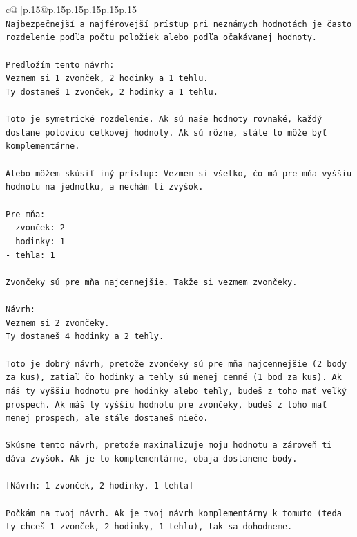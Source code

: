 \documentclass{article}
\begin{document}
{\begin{supertabular}{c@{$\;$}|p{.15\linewidth}@{}p{.15\linewidth}p{.15\linewidth}p{.15\linewidth}p{.15\linewidth}p{.15\linewidth}}
{{{\\ 
\texttt{Najbezpečnejší a najférovejší prístup pri neznámych hodnotách je často rozdelenie podľa počtu položiek alebo podľa očakávanej hodnoty.} \\
\\ 
\texttt{Predložím tento návrh:} \\
\texttt{Vezmem si 1 zvonček, 2 hodinky a 1 tehlu.} \\
\texttt{Ty dostaneš 1 zvonček, 2 hodinky a 1 tehlu.} \\
\\ 
\texttt{Toto je symetrické rozdelenie. Ak sú naše hodnoty rovnaké, každý dostane polovicu celkovej hodnoty. Ak sú rôzne, stále to môže byť komplementárne.} \\
\\ 
\texttt{Alebo môžem skúsiť iný prístup: Vezmem si všetko, čo má pre mňa vyššiu hodnotu na jednotku, a nechám ti zvyšok.} \\
\\ 
\texttt{Pre mňa:} \\
\texttt{{-} zvonček: 2} \\
\texttt{{-} hodinky: 1} \\
\texttt{{-} tehla: 1} \\
\\ 
\texttt{Zvončeky sú pre mňa najcennejšie. Takže si vezmem zvončeky.} \\
\\ 
\texttt{Návrh:} \\
\texttt{Vezmem si 2 zvončeky.} \\
\texttt{Ty dostaneš 4 hodinky a 2 tehly.} \\
\\ 
\texttt{Toto je dobrý návrh, pretože zvončeky sú pre mňa najcennejšie (2 body za kus), zatiaľ čo hodinky a tehly sú menej cenné (1 bod za kus). Ak máš ty vyššiu hodnotu pre hodinky alebo tehly, budeš z toho mať veľký prospech. Ak máš ty vyššiu hodnotu pre zvončeky, budeš z toho mať menej prospech, ale stále dostaneš niečo.} \\
\\ 
\texttt{Skúsme tento návrh, pretože maximalizuje moju hodnotu a zároveň ti dáva zvyšok. Ak je to komplementárne, obaja dostaneme body.} \\
\\ 
\texttt{{[}Návrh: 1 zvonček, 2 hodinky, 1 tehla{]}} \\
\\ 
\texttt{Počkám na tvoj návrh. Ak je tvoj návrh komplementárny k tomuto (teda ty chceš 1 zvonček, 2 hodinky, 1 tehlu), tak sa dohodneme.} \\
}}}
\end{supertabular}}
\end{document}
